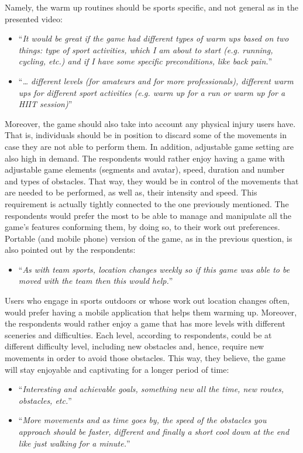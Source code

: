  Namely, the warm up routines should be sports specific, and not general as in the presented video:
\begin{itemize}
\item ``\textit{It would be great if the game had different types of warm ups based on two things:  type of sport activities, which I am about to start (e.g. running, cycling, etc.) and if I have some specific preconditions, like back pain.}''
\item ``\textit{… different levels (for amateurs and for more professionals), different warm ups for different sport activities (e.g. warm up for a run or warm up for a HIIT session)}''
\end{itemize}
Moreover, the game should also take into account any physical injury users have. That is, individuals should be in position to discard some of the movements in case they are not able to perform them. In addition, adjustable game setting are also high in demand. The respondents would rather enjoy having a game with adjustable game elements (segments and avatar), speed, duration and number and types of obstacles. That way, they would be in control of the movements that are needed to be performed, as well as, their intensity and speed. This requirement is actually tightly connected to the one previously mentioned. The respondents would prefer the most to be able to manage and manipulate all the game's features conforming them, by doing so, to their work out preferences. Portable (and mobile phone) version of the game, as in the previous question, is also pointed out by the respondents:
\begin{itemize}
\item ``\textit{As with team sports, location changes weekly so if this game was able to be moved with the team then this would help.}''
\end{itemize} 
Users who engage in sports outdoors or whose work out location changes often, would prefer having a mobile application that helps them warming up. Moreover, the respondents would rather enjoy a game that has more levels with different sceneries and difficulties. Each level, according to respondents, could be at different difficulty level, including new obstacles and, hence, require new movements in order to avoid those obstacles. This way, they believe, the game will stay enjoyable and captivating for a longer period of time:
\begin{itemize}
\item ``\textit{Interesting and achievable goals, something new all the time, new routes, obstacles, etc.}''
\item ``\textit{More movements and as time goes by, the speed of the obstacles you approach should be faster, different and finally a short cool down at the end like just walking for a minute.}''
\end{itemize}
